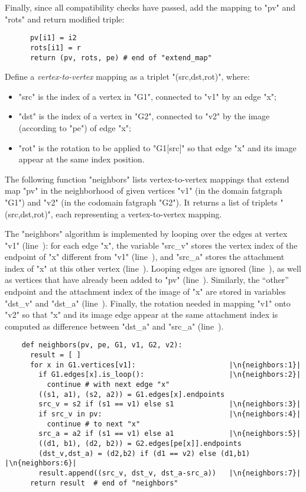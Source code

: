 Finally, since all compatibility checks have passed, add the mapping
to "pv" and "rots" and return modified triple:
\begin{lstlisting}
      pv[i1] = i2
      rots[i1] = r
      return (pv, rots, pe) # end of "extend_map"

\end{lstlisting}

\begin{definition}
  Define a \emph{vertex-to-vertex} mapping as a triplet
  "(src,dst,rot)", where:
  \begin{itemize}
  \item "src" is the index of a vertex in "G1", connected to "v1" by
    an edge "x";
  \item "dst" is the index of a vertex in "G2", connected to "v2" by
    the image (according to "pe") of edge "x";
  \item "rot" is the rotation to be applied to "G1[src]" so that edge
    "x" and its image appear at the same index position.
  \end{itemize}
\end{definition}

The following function "neighbors" lists vertex-to-vertex mappings
that extend map "pv" in the neighborhood of given vertices "v1" (in
the domain fatgraph "G1") and "v2" (in the codomain fatgraph "G2").
It returns a list of triplets "(src,dst,rot)", each representing a
vertex-to-vertex mapping.

The "neighbors" algorithm is implemented by looping over the edges at
vertex "v1" (line~): for each edge "x", the variable
"src_v" stores the vertex index of the endpoint of "x" different from
"v1" (line~), and "src_a" stores the attachment index
of "x" at this other vertex (line~). Looping edges are
ignored (line~), as well as vertices that have already
been added to "pv" (line~).  Similarly, the ``other''
endpoint and the attachment index of the image of "x" are stored in
variables "dst_v" and "dst_a" (line~).  Finally, the
rotation needed in mapping "v1" onto "v2" so that "x" and its image
edge appear at the same attachment index is computed as difference
between "dst_a" and "src_a" (line~).
\begin{lstlisting}
    def neighbors(pv, pe, G1, v1, G2, v2):
      result = [ ]
      for x in G1.vertices[v1]:                      |\n{neighbors:1}|
        if G1.edges[x].is_loop():                    |\n{neighbors:2}|
          continue # with next edge "x"
        ((s1, a1), (s2, a2)) = G1.edges[x].endpoints 
        src_v = s2 if (s1 == v1) else s1             |\n{neighbors:3}|
        if src_v in pv:                              |\n{neighbors:4}|
          continue # to next "x"
        src_a = a2 if (s1 == v1) else a1             |\n{neighbors:5}|
        ((d1, b1), (d2, b2)) = G2.edges[pe[x]].endpoints
        (dst_v,dst_a) = (d2,b2) if (d1 == v2) else (d1,b1) |\n{neighbors:6}|
        result.append((src_v, dst_v, dst_a-src_a))   |\n{neighbors:7}|
      return result  # end of "neighbors"
      
\end{lstlisting}

